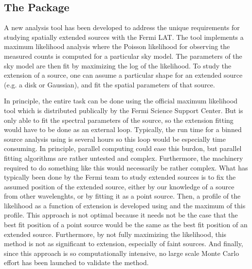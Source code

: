 \documentclass[12pt,preprint]{aastex}
\newcommand{\pointlike}{\text{\em pointlike}\xspace}
\newcommand{\gtlike}{\text{\em gtlike}\xspace}
\begin{document}
\subsection{The \pointlike Package}

A new analysis tool has been developed to address the unique requirements
for studying spatially extended sources with the Fermi LAT. The tool
implements a maximum likelihood analysis where the Poisson likelihood
for observing the measured counts is computed for a particular sky
model. The parameters of the sky model are then fit by maximizing the log
of the likelihood.  To study the extension of a source, one can assume
a particular shape for an extended source (e.g. a disk or Gaussian),
and fit the spatial parameters of that source.

In principle, the entire task can be done using the official maximum
likelihood tool \gtlike which is distributed publically by the Fermi
Science Support Center\cite{fssc}.  But \gtlike is only able to fit the
spectral parameters of the source, so the extension fitting would have
to be done as an external loop. Typically, the run time for a binned
source analysis using \gtlike is several hours so this loop would be
especially time consuming. In principle, parallel computing could ease
this burdon, but parallel fitting algorithms are rather untested and
complex. Furthermore, the machinery required to do something like this
would necessarily be rather complex. What has typically been done by
the Fermi team to study extended sources is to fix the assumed position
of the extended source, either by our knowledge of a source from other
wavelenghts, or by fitting it as a point source. Then, a profile of the
likelihood as a function of extension is developed using \gtlike and the
maximum of this profile. This approach is not optimal because it needs
not be the case that the best fit position of a point source would be
the same as the best fit position of an extended source. Furthermore, by
not fully maximizing the likelihood, this method is not as significant to
extension, especially of faint sources. And finally, since this approach
is so computationally intensive, no large scale Monte Carlo effort has
been launched to validate the method.
\end{document}
